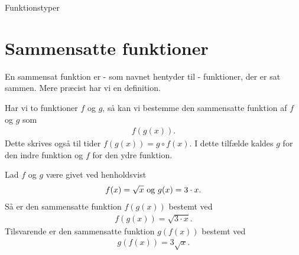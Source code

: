 \begin{center}
\Huge
Funktionstyper 
\end{center}
\section*{Sammensatte funktioner}
En sammensat funktion er - som navnet hentyder til - funktioner, der er sat sammen. Mere præcist har vi en definition.
\begin{defn}
Har vi to funktioner $f$ og $g$, så kan vi bestemme  den sammensatte funktion af $f$ og $g$ som
\begin{align*}
f(g(x)).
\end{align*}
Dette skrives også til tider $f(g(x))= g\circ f(x)$. I dette tilfælde kaldes $g$ for den indre funktion og $f$ for den ydre funktion.
\end{defn}
\begin{exa}
Lad $f$ og $g$ være givet ved henholdsvist
\begin{align*}
f(x) = \sqrt{x} \textnormal{ og }g(x) = 3\cdot x.
\end{align*}
Så er den sammensatte funktion $f(g(x))$ bestemt ved
\begin{align*}
f(g(x)) = \sqrt{3\cdot x}.
\end{align*}
Tilsvarende er den sammensatte funktion $g(f(x))$ bestemt ved
\begin{align*}
g(f(x)) = 3\sqrt{x}.
\end{align*}
\end{exa}
